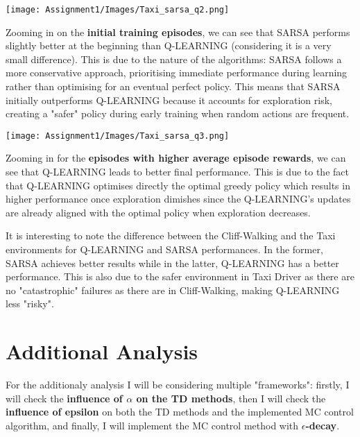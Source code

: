 \documentclass[11pt,a4paper]{article}
\begin{document}
\noindent
\begin{minipage}{0.5\textwidth}
    \texttt{[image: Assignment1/Images/Taxi\_sarsa\_q2.png]}
\end{minipage}%
\hfill%
\begin{minipage}{0.45\textwidth}
    Zooming in on the \textbf{initial training episodes}, we can see that SARSA performs slightly better at the beginning than Q-LEARNING (considering it is a very small difference). This is due to the nature of the algorithms: SARSA follows a more conservative approach, prioritising immediate performance during learning rather than optimising for an eventual perfect policy. This means that SARSA initially outperforms Q-LEARNING because it accounts for exploration risk, creating a "safer" policy during early training when random actions are frequent.
\end{minipage}

\noindent
\begin{minipage}{0.5\textwidth}
    \texttt{[image: Assignment1/Images/Taxi\_sarsa\_q3.png]}
\end{minipage}%
\hfill%
\begin{minipage}{0.45\textwidth}
    Zooming in for the \textbf{episodes with higher average episode rewards}, we can see that Q-LEARNING leads to better final performance. This is due to the fact that Q-LEARNING optimises directly the optimal greedy policy which results in higher performance once exploration dimishes since the Q-LEARNING's updates are already aligned with the optimal policy when exploration decreases.
\end{minipage}

\vline

It is interesting to note the difference between the Cliff-Walking and the Taxi environments for Q-LEARNING and SARSA performances. In the former, SARSA achieves better results while in the latter, Q-LEARNING has a better performance. This is also due to the safer environment in Taxi Driver as there are no "catastrophic" failures as there are in Cliff-Walking, making Q-LEARNING less "risky".

\section{Additional Analysis}

For the additionaly analysis I will be considering multiple "frameworks": firstly, I will check the \textbf{influence of $\alpha$ on the TD methods}, then I will check the\textbf{ influence of epsilon} on both the TD methods and the implemented MC control algorithm, and finally, I will implement the MC control method with \textbf{$\epsilon$-decay}.
\end{document}
